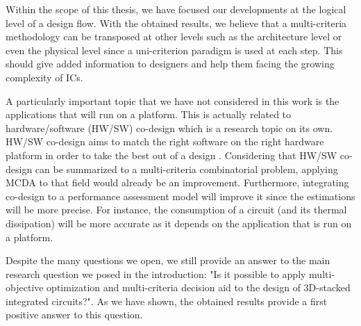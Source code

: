 Within the scope of this thesis, we have focused our developments at the logical level of a design flow. With the obtained results, we believe that a multi-criteria methodology can be transposed at other levels such as the architecture level or even the physical level since a uni-criterion paradigm is used at each step. This should give added information to designers and help them facing the growing complexity of ICs.

A particularly important topic that we have not considered in this work is the applications that will run on a platform. This is actually related to hardware/software (HW/SW) co-design which is a research topic on its own. HW/SW co-design aims to match the right software on the right hardware platform in order to take the best out of a design \cite{abdallah2011}. Considering that HW/SW co-design can be summarized to a multi-criteria combinatorial problem, applying MCDA to that field would already be an improvement. Furthermore, integrating co-design to a performance assessment model will improve it since the estimations will be more precise. For instance, the consumption of a circuit (and its thermal dissipation) will be more accurate as it depends on the application that is run on a platform.

Despite the many questions we open, we still provide an answer to the main research question we posed in the introduction: "Is it possible to apply multi-objective optimization and multi-criteria decision aid to the design of 3D-stacked integrated circuits?". As we have shown, the obtained results provide a first positive answer to this question.